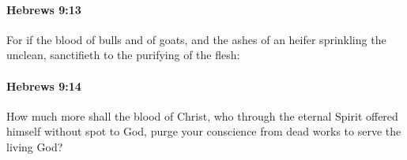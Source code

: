 		\paragraph{Hebrews 9:13} %
			\label{HEBREWS-9-13}

			For if the blood of bulls and of goats, and the ashes of an heifer sprinkling the unclean, sanctifieth to the purifying of the flesh:

			\begin{framed}
			\scriptsize
				\begin{compactdesc}
					\item[SBLG] 
				\end{compactdesc}
			\end{framed}

		\paragraph{Hebrews 9:14} %
			\label{HEBREWS-9-14}

			How much more shall the blood of Christ, who through the eternal Spirit offered himself without spot to God, purge your conscience from dead works to serve the living God?

